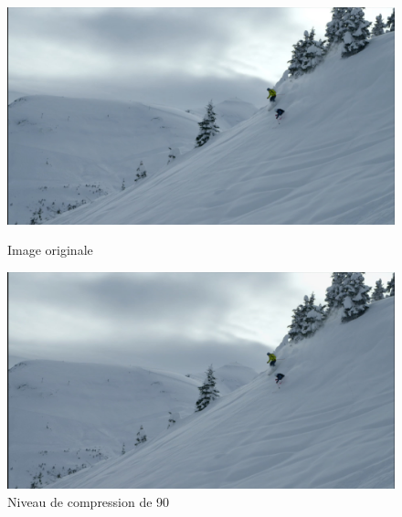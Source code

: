 \documentclass[12pt]{article}
\begin{document}
\begin{figure}[h]
    \begin{minipage}[c]{.46\linewidth}
        \centering
        \includegraphics[scale=0.1]{skilatex}
        \caption{Image originale}
    \end{minipage}
    \hfill%
    \begin{minipage}[c]{.46\linewidth}
        \centering
        \includegraphics[scale=0.1]{skilatex90}
        \caption{Niveau de compression de 90}
    \end{minipage}
\end{figure}
\end{document}
